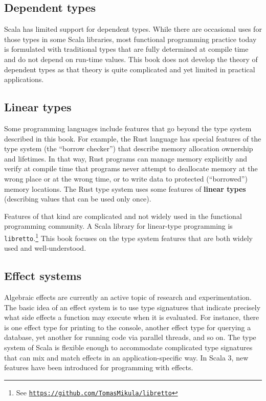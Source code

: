 \subsection{Dependent types}

Scala has limited support for dependent types.
While there are occasional uses for those types in some Scala libraries,
most functional programming practice today is formulated with traditional
types that are fully determined at compile time and do not depend
on run-time values. This book does not develop the theory of dependent
types as that theory is quite complicated and yet limited in practical
applications.

\subsection{Linear types}

Some programming languages include features that go beyond the type
system described in this book. For example, the Rust language has
special features of the type system (the \textsf{``}borrow checker\textsf{''}) that
describe memory allocation ownership and lifetimes. In that way, Rust
programs can manage memory explicitly and verify at compile time that
programs never attempt to deallocate memory at the wrong place or
at the wrong time, or to write data to protected (\textsf{``}borrowed\textsf{''})
memory locations. The Rust type system uses some features of \textbf{linear
types} (describing values
that can be used only once).

Features of that kind are complicated and not widely used in the functional
programming community. A Scala library for linear-type programming
is \lstinline!libretto!.\footnote{See \texttt{\href{https://github.com/TomasMikula/libretto}{https://github.com/TomasMikula/libretto}}}
This book focuses on the type system features that are both widely
used and well-understood.

\subsection{Effect systems}

Algebraic effects are currently an active topic of research and experimentation.
The basic idea of an effect system is to use type signatures that
indicate precisely what side effects a function may execute when it
is evaluated. For instance, there is one effect type for printing
to the console, another effect type for querying a database, yet another
for running code via parallel threads, and so on. The type system
of Scala is flexible enough to accommodate complicated type signatures
that can mix and match effects in an application-specific way. In
Scala 3, new features have been introduced for programming with effects.

